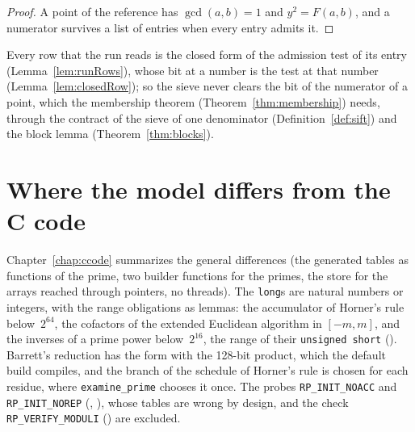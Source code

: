 \begin{proof}
  \leanok
  A point of the reference has $\gcd(a, b) = 1$ and $y^2 = F(a, b)$, and a numerator survives a
  list of entries when every entry admits it.
\end{proof}

Every row that the run reads is the closed form of the admission test of its entry
(Lemma~\ref{lem:runRows}), whose bit at a number is the test at that number
(Lemma~\ref{lem:closedRow}); so the sieve never clears the bit of the numerator of a point, which
the membership theorem (Theorem~\ref{thm:membership}) needs, through the contract of the sieve of
one denominator (Definition~\ref{def:sift}) and the block lemma (Theorem~\ref{thm:blocks}).

\section{Where the model differs from the C code}\label{sec:rowsDeviations}

Chapter~\ref{chap:ccode} summarizes the general differences (the generated tables as functions of
the prime, two builder functions for the primes, the store for the arrays reached through pointers,
no threads). The \verb|long|s are natural numbers or integers, with the range obligations as
lemmas: the accumulator of Horner's rule below~$2^{64}$, the cofactors of the extended Euclidean
algorithm in $[-m, m]$, and the inverses of a prime power below~$2^{16}$, the range of their
\verb|unsigned short|
(). Barrett's reduction
has the form with the 128-bit product, which the default build compiles, and the branch of
the schedule of Horner's rule is chosen for each residue, where \verb|examine_prime| chooses it
once. The probes \verb|RP_INIT_NOACC| and \verb|RP_INIT_NOREP| (,
), whose tables are wrong by design, and the check
\verb|RP_VERIFY_MODULI| () are excluded.

